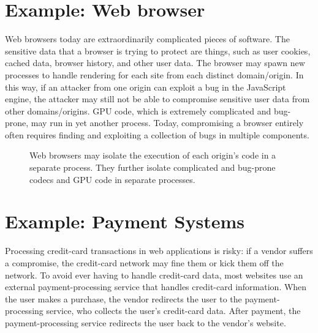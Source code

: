 \documentclass[
  letterpaper,
]{scrbook}
\theoremstyle{definition}
\theoremstyle{plain}
\theoremstyle{plain}
\theoremstyle{remark}
\begin{document}
\section{Example: Web browser}\label{example-web-browser}

Web browsers today are extraordinarily complicated pieces of software.
The sensitive data that a browser is trying to protect are things, such
as user cookies, cached data, browser history, and other user data. The
browser may spawn new processes to handle rendering for each site from
each distinct domain/origin. In this way, if an attacker from one origin
can exploit a bug in the JavaScript engine, the attacker may still not
be able to compromise sensitive user data from other domains/origins.
GPU code, which is extremely complicated and bug-prone, may run in yet
another process. Today, compromising a browser entirely often requires
finding and exploiting a collection of bugs in multiple components.

\begin{figure}


\caption{\label{fig-browser}Web browsers may isolate the execution of
each origin's code in a separate process. They further isolate
complicated and bug-prone codecs and GPU code in separate processes.}

\end{figure}%

\section{Example: Payment Systems}\label{example-payment-systems}

Processing credit-card transactions in web applications is risky: if a
vendor suffers a compromise, the credit-card network may fine them or
kick them off the network. To avoid ever having to handle credit-card
data, most websites use an external payment-processing service that
handles credit-card information. When the user makes a purchase, the
vendor redirects the user to the payment-processing service, who
collects the user's credit-card data. After payment, the
payment-processing service redirects the user back to the vendor's
website.
\end{document}
